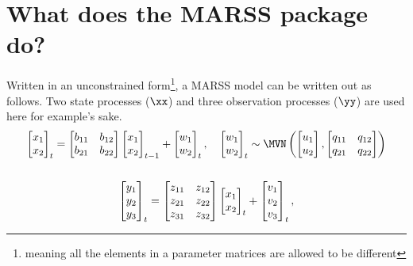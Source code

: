 \section{What does the MARSS package do?}
Written in an unconstrained form\footnote{meaning all the elements in a parameter matrices are allowed to be different}, a MARSS model can be written out as follows. Two state processes ($\xx$) and three observation processes ($\yy$) are used here for example's sake.
\begin{gather*}
\begin{bmatrix}x_1\\ x_2\end{bmatrix}_t
= \begin{bmatrix}b_{11}&b_{12}\\b_{21}&b_{22}\end{bmatrix}
\begin{bmatrix}x_1\\x_2\end{bmatrix}_{t-1}
+ \begin{bmatrix}w_1\\ w_2\end{bmatrix}_t,\quad 
\begin{bmatrix}w_1\\ w_2\end{bmatrix}_t \sim \MVN\begin{pmatrix}\begin{bmatrix}u_1\\u_2\end{bmatrix},\begin{bmatrix}q_{11}&q_{12}\\q_{21}&q_{22}\end{bmatrix} \end{pmatrix}  \\
\\
\begin{bmatrix}y_1\\ y_2\\ y_3\end{bmatrix}_t
= \begin{bmatrix}z_{11}&z_{12}\\ z_{21}&z_{22}\\ z_{31}&z_{32}\end{bmatrix}
\begin{bmatrix}x_1\\ x_2\end{bmatrix}_t
+ \begin{bmatrix}v_1\\ v_2\\ v_3\end{bmatrix}_t,

\end{gather*}

